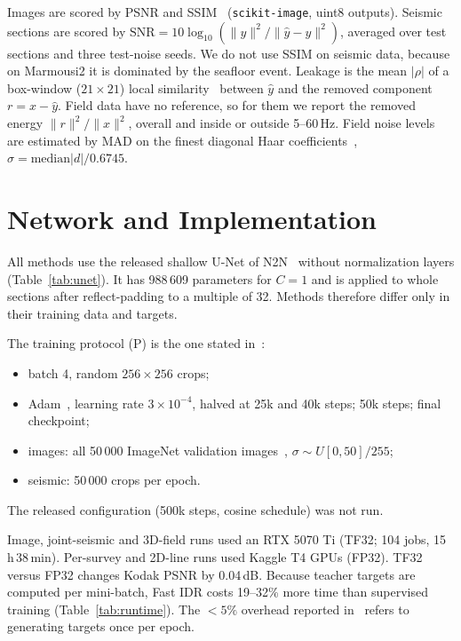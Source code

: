\documentclass[journal]{IEEEtran}
\begin{document}
Images are scored by PSNR and SSIM~\cite{wang2004ssim} (\texttt{scikit-image}, uint8 outputs). Seismic sections are scored by $\mathrm{SNR}=10\log_{10}(\|y\|^2/\|\hat y-y\|^2)$, averaged over test sections and three test-noise seeds. We do not use SSIM on seismic data, because on Marmousi2 it is dominated by the seafloor event. Leakage is the mean $|\rho|$ of a box-window ($21\times21$) local similarity~\cite{chen2015lso} between $\hat y$ and the removed component $r=x-\hat y$. Field data have no reference, so for them we report the removed energy $\|r\|^2/\|x\|^2$, overall and inside or outside 5--60\,Hz. Field noise levels are estimated by MAD on the finest diagonal Haar coefficients~\cite{donoho1994ideal}, $\hat\sigma=\mathrm{median}|d|/0.6745$.

\section{Network and Implementation}\label{sec:impl}
All methods use the released shallow U-Net of N2N~\cite{lehtinen2018n2n,ronneberger2015unet} without normalization layers (Table~\ref{tab:unet}). It has 988\,609 parameters for $C=1$ and is applied to whole sections after reflect-padding to a multiple of 32. Methods therefore differ only in their training data and targets.

The training protocol (P) is the one stated in~\cite{zhang2022idr}:
\begin{itemize}
\item batch 4, random $256\times256$ crops;
\item Adam~\cite{kingma2015adam}, learning rate $3\times10^{-4}$, halved at 25k and 40k steps; 50k steps; final checkpoint;
\item images: all 50\,000 ImageNet validation images~\cite{deng2009imagenet}, $\sigma\sim U[0,50]/255$;
\item seismic: 50\,000 crops per epoch.
\end{itemize}
The released configuration (500k steps, cosine schedule) was not run.

Image, joint-seismic and 3D-field runs used an RTX 5070 Ti (TF32; 104 jobs, 15\,h\,38\,min). Per-survey and 2D-line runs used Kaggle T4 GPUs (FP32). TF32 versus FP32 changes Kodak PSNR by 0.04\,dB. Because teacher targets are computed per mini-batch, Fast IDR costs 19--32\% more time than supervised training (Table~\ref{tab:runtime}). The $<5\%$ overhead reported in~\cite{zhang2022idr} refers to generating targets once per epoch.
\end{document}
